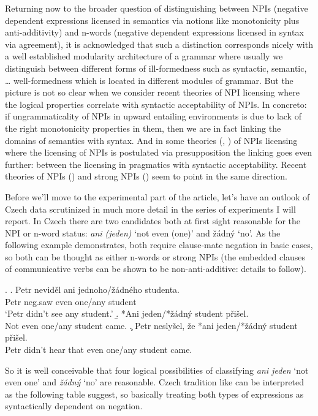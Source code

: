 \documentclass[12pt]{scrartcl}
\begin{document}
Returning now to the broader question of distinguishing between NPIs (negative dependent expressions licensed in semantics via notions like monotonicity plus anti-additivity) and n-words (negative dependent expressions licensed in syntax via agreement), it is acknowledged that such a distinction corresponds nicely with a well established modularity architecture of a grammar where usually we  distinguish between different forms of ill-formedness such as syntactic, semantic, \ldots{} well-formedness which is located in different modules of grammar. But the picture is not so clear when we consider recent theories of NPI licensing where the  logical properties correlate with syntactic acceptability of NPIs. In concreto: if ungrammaticality of NPIs in upward entailing environments is due to lack of the right monotonicity properties in them, then we are in fact linking the domains of semantics with syntax. And in some theories (\citealt{heim1984note}, \citealp{crnivc2014against}) of NPIs licensing where the licensing of NPIs is postulated via presupposition the linking goes even further: between the licensing in pragmatics with syntactic acceptability. Recent theories of NPIs (\citealt{chierchia2013logic}) and strong NPIs (\citealt{gajewski2011licensing}) seem to point in the same direction.

Before we'll move to the experimental part of the article, let's have an outlook of Czech data scrutinized in much more detail in the series of experiments I will report. In Czech there are two candidates both at first sight reasonable for the NPI or n-word status: \textit{ani (jeden)} `not even (one)' and žádný `no'. As the following example demonstrates, both require clause-mate negation in basic cases, so both can be thought as either n-words or strong NPIs (the embedded clauses of communicative verbs can be shown to be non-anti-additive: details to follow).

\ex. \ag. Petr neviděl ani jednoho/žádného studenta.\\
Petr neg.saw even one/any student\\
`Petr didn't see any student.' \b. *Ani jeden/*žádný student přišel.\\
Not even one/any student came. \c. Petr neslyšel, že *ani jeden/*žádný
student přišel.\\
Petr didn't hear that even one/any student came.

So it is well conceivable that four logical possibilities of classifying \textit{ani jeden} `not even one' and \textit{žádný} `no' are reasonable. Czech tradition like \cite{havranek1960slovnik} can be interpreted as the following table suggest, so basically treating both types of expressions as syntactically dependent on negation.
\end{document}
